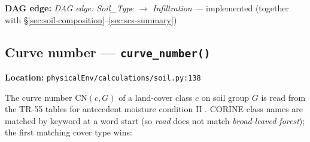 \documentclass[11pt]{article}
\newcommand{\code}[1]{\texttt{#1}}
\newcommand{\dagedge}[1]{\textit{DAG edge: #1}}
\newcommand{\statusdone}{\textcolor{green!50!black}{implemented}}
\begin{document}
\textbf{DAG edge:} \dagedge{Soil\_Type $\rightarrow$ Infiltration} --- \statusdone{} (together with \S\ref{sec:soil-composition}--\ref{sec:scs-summary})

\subsection{Curve number --- \code{curve\_number()}}
\textbf{Location:} \code{physicalEnv/calculations/soil.py:138}

The curve number $\mathrm{CN}(c, G)$ of a land-cover class $c$ on soil group $G$ is read from the TR-55 tables for antecedent moisture condition II \cite{TR55}. CORINE class names are matched by keyword at a word start (so \textit{road} does not match \textit{broad-leaved forest}); the first matching cover type wins:
\end{document}
